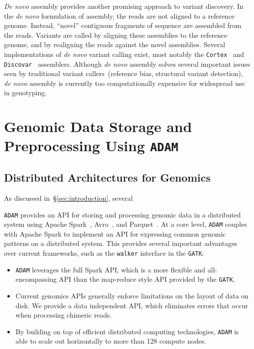 \documentclass[masters]{ucbthesis}
\begin{document}
\emph{De novo} assembly provides another promising approach to variant discovery. In the \emph{de
novo} formulation of assembly, the reads are not aligned to a reference genome. Instead, ``novel''
contiguous fragments of sequence are assembled from the reads. Variants are called by aligning these
assemblies to the reference genome, and by realigning the reads against the novel assemblies. Several
implementations of \emph{de novo} variant calling exist, most notably the \texttt{Cortex}~\cite{iqbal12}
and \texttt{Discovar}~\cite{weisenfeld14} assemblers. Although \emph{de novo} assembly solves
several important issues seen by traditional variant callers~(reference bias, structural variant detection),
\emph{de novo} assembly is currently too computationally expensive for widespread use in genotyping.

\chapter{Genomic Data Storage and Preprocessing Using \texttt{ADAM}}

\section{Distributed Architectures for Genomics}
\label{sec:distributed-architectures}

As discussed in~\S\ref{sec:introduction}, several 

\texttt{ADAM} provides an API for storing and processing genomic data in a distributed system using
Apache Spark~\cite{zaharia12}, Avro~\cite{avro}, and Parquet~\cite{parquet}. At a core level,
\texttt{ADAM} couples with Apache Spark to implement an API for expressing common genomic patterns
on a distributed system. This provides several important advantages over current frameworks, such as
the \texttt{walker} interface in the \texttt{GATK}:

\begin{itemize}
\item \texttt{ADAM} leverages the full Spark API, which is a more flexible and all-encompassing API than
the map-reduce style API provided by the \texttt{GATK},
\item Current genomics APIs generally enforce limitations on the layout of data on disk. We provide a
data independent API, which eliminates errors that occur when processing chimeric reads.
\item By building on top of efficient distributed computing technologies, \texttt{ADAM} is able to scale out
horizontally to more than 128 compute nodes.
\end{itemize}
\end{document}
